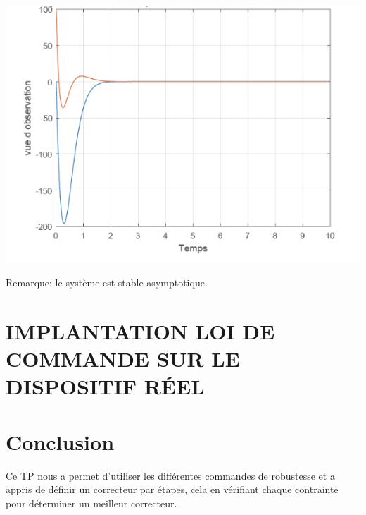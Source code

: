 \documentclass[12pt, a4paper, openany]{report}
\begin{document}
\begin{center}
{\includegraphics[scale=0.6]{fig10.png}} 
\label{fiig10}
\end{center} 

Remarque: le système est stable asymptotique.

\chapter{IMPLANTATION LOI DE COMMANDE SUR LE DISPOSITIF RÉEL}
     
       
     
\chapter*{Conclusion}

Ce TP nous a permet d'utiliser les différentes commandes de robustesse et a appris de définir un correcteur par étapes, cela en vérifiant chaque contrainte pour déterminer un meilleur correcteur.\\










 







%
%
\end{document}
